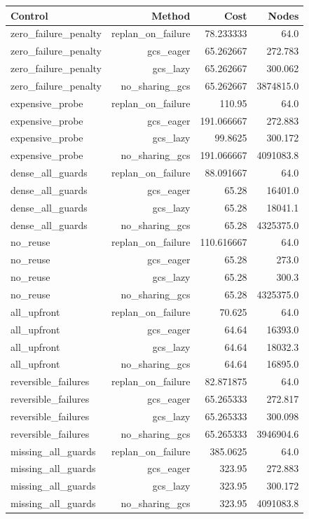 \begin{tabular}{lrrr}
\toprule
Control & Method & Cost & Nodes \\
\midrule
zero\_failure\_penalty & replan\_on\_failure & 78.233333 & 64.0 \\
zero\_failure\_penalty & gcs\_eager & 65.262667 & 272.783 \\
zero\_failure\_penalty & gcs\_lazy & 65.262667 & 300.062 \\
zero\_failure\_penalty & no\_sharing\_gcs & 65.262667 & 3874815.0 \\
expensive\_probe & replan\_on\_failure & 110.95 & 64.0 \\
expensive\_probe & gcs\_eager & 191.066667 & 272.883 \\
expensive\_probe & gcs\_lazy & 99.8625 & 300.172 \\
expensive\_probe & no\_sharing\_gcs & 191.066667 & 4091083.8 \\
dense\_all\_guards & replan\_on\_failure & 88.091667 & 64.0 \\
dense\_all\_guards & gcs\_eager & 65.28 & 16401.0 \\
dense\_all\_guards & gcs\_lazy & 65.28 & 18041.1 \\
dense\_all\_guards & no\_sharing\_gcs & 65.28 & 4325375.0 \\
no\_reuse & replan\_on\_failure & 110.616667 & 64.0 \\
no\_reuse & gcs\_eager & 65.28 & 273.0 \\
no\_reuse & gcs\_lazy & 65.28 & 300.3 \\
no\_reuse & no\_sharing\_gcs & 65.28 & 4325375.0 \\
all\_upfront & replan\_on\_failure & 70.625 & 64.0 \\
all\_upfront & gcs\_eager & 64.64 & 16393.0 \\
all\_upfront & gcs\_lazy & 64.64 & 18032.3 \\
all\_upfront & no\_sharing\_gcs & 64.64 & 16895.0 \\
reversible\_failures & replan\_on\_failure & 82.871875 & 64.0 \\
reversible\_failures & gcs\_eager & 65.265333 & 272.817 \\
reversible\_failures & gcs\_lazy & 65.265333 & 300.098 \\
reversible\_failures & no\_sharing\_gcs & 65.265333 & 3946904.6 \\
missing\_all\_guards & replan\_on\_failure & 385.0625 & 64.0 \\
missing\_all\_guards & gcs\_eager & 323.95 & 272.883 \\
missing\_all\_guards & gcs\_lazy & 323.95 & 300.172 \\
missing\_all\_guards & no\_sharing\_gcs & 323.95 & 4091083.8 \\
\bottomrule
\end{tabular}

